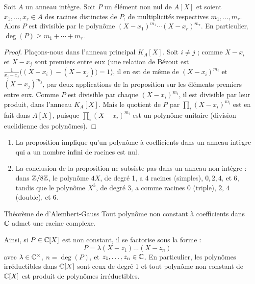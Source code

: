\documentclass[]{report}
\begin{document}
\begin{prop}{}{}
    Soit $A$ un anneau intègre. Soit $P$ un élément non nul de $A[X]$ et soient $x_1, \ldots, x_r \in A$ des racines distinctes de $P$, de multiplicités respectives $m_1, \ldots, m_r$. Alors $P$ est divisible par le polynôme $(X - x_1)^{m_1} \cdots (X - x_r)^{m_r}$. En particulier, $\deg(P) \ge m_1 + \cdots + m_r$.
\end{prop}

\begin{proof}
    Plaçons-nous dans l'anneau principal $K_A[X]$. Soit $i \ne j$ ; comme $X - x_i$ et $X - x_j$ sont premiers entre eux (une relation de Bézout est $\frac{1}{x_j - x_i}\big((X - x_i) - (X - x_j)\big) = 1$), il en est de même de $(X - x_i)^{m_i}$ et $(X - x_j)^{m_j}$, par deux applications de la proposition sur les éléments premiers entre eux. Comme $P$ est divisible par chaque $(X - x_i)^{m_i}$, il est divisible par leur produit, dans l'anneau $K_A[X]$. Mais le quotient de $P$ par $\prod_i (X - x_i)^{m_i}$ est en fait dans $A[X]$, puisque $\prod_i (X - x_i)^{m_i}$ est un polynôme unitaire (division euclidienne des polynômes).
\end{proof}

\begin{re}{}{}
    \begin{enumerate}
        \item La proposition implique qu'un polynôme à coefficients dans un anneau intègre qui a un nombre infini de racines est nul.
        \item La conclusion de la proposition ne subsiste pas dans un anneau non intègre : dans $\mathbb{Z}/8\mathbb{Z}$, le polynôme $4X$, de degré 1, a 4 racines (simples), $0, 2, 4$, et $6$, tandis que le polynôme $X^3$, de degré 3, a comme racines $0$ (triple), $2$, $4$ (double), et $6$.
    \end{enumerate}
\end{re}

\begin{tm}{Théorème de d'Alembert-Gauss}{}
    Tout polynôme non constant à coefficients dans $\mathbb{C}$ admet une racine complexe.
\end{tm}

Ainsi, si $P \in \mathbb{C}[X]$ est non constant, il se factorise sous la forme :
\[P = \lambda (X - z_1) \dots (X - z_n)\]
avec $\lambda \in \mathbb{C}^{\times}$, $n = \deg(P)$, et $z_1, \ldots, z_n \in \mathbb{C}$. En particulier, les polynômes irréductibles dans $\mathbb{C}[X]$ sont ceux de degré 1 et tout polynôme non constant de $\mathbb{C}[X]$ est produit de polynômes irréductibles.
\end{document}
